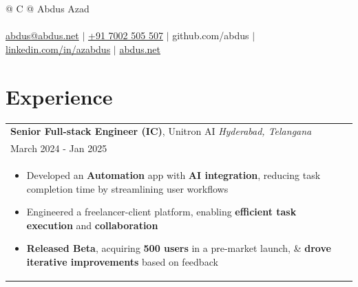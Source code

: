 \documentclass[a4paper,8pt]{article}
\begin{document}
\pagestyle{empty}



\begin{tabularx}{\linewidth}{@{} C @{}}
\color[HTML]{1C033C} \Huge{Abdus Azad} \\[4pt]
\\
\large{
    {\href{mailto:abdus@abdus.net}{ abdus@abdus.net}} $|$
    \href{tel:+917002505507}{ +91 7002 505 507} $|$
    {\href{https://github.com/abdus} github.com/abdus } $|$
    {\href{https://linkedin.com/in/azabdus}{ linkedin.com/in/azabdus}} $|$
    {\href{https://abdus.net}{ abdus.net}}
}




\end{tabularx}

\section{\textbf{Experience}}
\begin{tabularx}{\linewidth}{ @{}l r@{} }
\large\textbf{Senior Full-stack Engineer (IC)}, Unitron AI \hfill \color[HTML]{4B28A4} \normalsize\textit{Hyderabad, Telangana} \\[4pt]
\large{March 2024 - Jan 2025} \hfill \\[4pt]
\begin{minipage}[t]{\linewidth}
    \begin{itemize}[nosep,after=\strut, leftmargin=2em, itemsep=2pt]
        \item Developed an \textbf{Automation} app with \textbf{AI integration}, reducing task completion time by streamlining user workflows
        \item Engineered a freelancer-client platform, enabling \textbf{efficient task execution} and \textbf{collaboration}
        \item \textbf{Released Beta}, acquiring \textbf{500 users} in a pre-market launch, \& \textbf{drove iterative improvements} based on feedback
    \end{itemize}
\end{minipage}
\end{tabularx}
\end{document}
